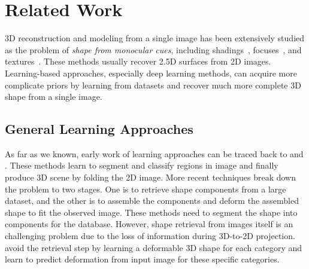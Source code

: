 \section{Related Work}
3D reconstruction and modeling from a single image has been extensively studied as the problem of \emph{shape from monocular cues}, including shadings~\cite{shapefromshadingsurvey}, focuses~\cite{shapefromdf1,shapefromdf2}, and textures~\cite{Aloimonos1988}. 
These methods usually recover 2.5D surfaces from 2D images. 
Learning-based approaches, especially deep learning methods, can acquire more complicate priors by learning from datasets and recover much more complete 3D shape from a single image.
 
\subsection{General Learning Approaches}
As far as we known, early work of learning approaches can be traced back to \cite{Hoiem2007} and \cite{learn3D2007}. These methods learn to segment and classify regions in image and finally produce 3D scene by folding the 2D image.
%
More recent techniques break down the problem to two stages\cite{Su:2014,jointimgshape}. One is to retrieve shape components from a large dataset, and the other is to assemble the components and deform the assembled shape to fit the observed image. These methods need to segment the shape into components for the database.
%
However, shape retrieval from images itself is an challenging problem due to the loss of information during 3D-to-2D projection. 
\cite{imgrecon15} avoid the retrieval step by learning a deformable 3D shape for each category and learn to predict deformation from input image for these specific categories.
%
